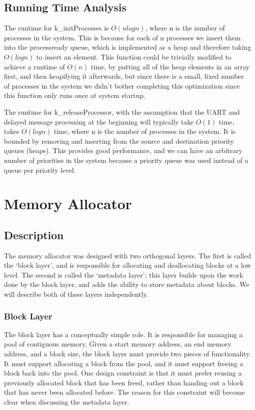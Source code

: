 \documentclass[12pt]{report}
\begin{document}
\section{Running Time Analysis}
The runtime for k\_initProcesses is $O(nlogn)$, where n is the number of
processes in the system. This is because for each of n processes we insert them
into the process\-ready queue, which is implemented as a heap and therefore
taking $O(logn)$ to insert an element. This function could be trivially
modified to achieve a runtime of $O(n)$ time, by putting all of the heap
elements in an array first, and then heapifying it afterwards, but since there
is a small, fixed number of processes in the system we didn't bother completing
this optimization since this function only runs once at system startup.

The runtime for k\_releaseProcessor, with the assumption that the UART and
delayed message processing at the beginning will typically take $O(1)$ time,
takes $O(log n)$ time, where n is the number of processes in the system. It is
bounded by removing and inserting from the source and destination priority
queues (heaps). This provides good performance, and we can have an arbitrary
number of priorities in the system because a priority queue was used instead of
a queue per priority level.

\chapter{Memory Allocator}

\section{Description}
    The memory allocator was designed with two orthogonal layers. The first is
    called the `block layer', and is responsible for allocating and deallocating
    blocks at a low level. The second is called the `metadata layer'; this layer
    builds upon the work done by the block layer, and adds the ability to store
    metadata about blocks. We will describe both of these layers independently.

\subsection{Block Layer}
    The block layer has a conceptually simple role. It is responsible for
    managing a pool of contiguous memory. Given a start memory address, an
    end memory address, and a block size, the block
    layer must provide two pieces of functionality. It must support allocating
    a block from the pool, and it must support freeing a block back into the
    pool. One design constraint is that it must prefer reusing a previously
    allocated block that has been freed, rather than handing out a block that
    has never been allocated before. The reason for this constraint will
    become clear when discussing the metadata layer.
\end{document}

